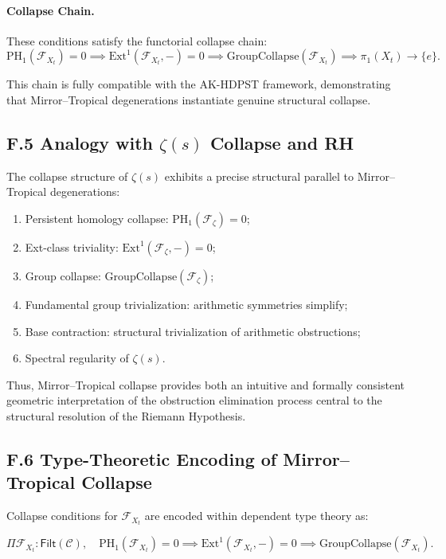 \documentclass[11pt]{article}
\begin{document}
\paragraph{Collapse Chain.}  
These conditions satisfy the functorial collapse chain:
\[
\mathrm{PH}_1(\mathcal{F}_{X_t}) = 0 
\implies \mathrm{Ext}^1(\mathcal{F}_{X_t}, -) = 0 
\implies \mathrm{GroupCollapse}(\mathcal{F}_{X_t}) 
\implies \pi_1(X_t) \longrightarrow \{ e \}.
\]

This chain is fully compatible with the AK-HDPST framework, demonstrating that Mirror–Tropical degenerations instantiate genuine structural collapse.

\subsection*{F.5 Analogy with $\zeta(s)$ Collapse and RH}

The collapse structure of $\zeta(s)$ exhibits a precise structural parallel to Mirror–Tropical degenerations:

\begin{enumerate}
    \item Persistent homology collapse: $\mathrm{PH}_1(\mathcal{F}_{\zeta}) = 0$;
    \item Ext-class triviality: $\mathrm{Ext}^1(\mathcal{F}_{\zeta}, -) = 0$;
    \item Group collapse: $\mathrm{GroupCollapse}(\mathcal{F}_{\zeta})$;
    \item Fundamental group trivialization: arithmetic symmetries simplify;
    \item Base contraction: structural trivialization of arithmetic obstructions;
    \item Spectral regularity of $\zeta(s)$.
\end{enumerate}

Thus, Mirror–Tropical collapse provides both an intuitive and formally consistent geometric interpretation of the obstruction elimination process central to the structural resolution of the Riemann Hypothesis.

\subsection*{F.6 Type-Theoretic Encoding of Mirror–Tropical Collapse}

Collapse conditions for $\mathcal{F}_{X_t}$ are encoded within dependent type theory as:

\[
\Pi \mathcal{F}_{X_t} : \mathsf{Filt}(\mathcal{C}), \quad 
\mathrm{PH}_1(\mathcal{F}_{X_t}) = 0 \implies 
\mathrm{Ext}^1(\mathcal{F}_{X_t}, -) = 0 \implies 
\mathrm{GroupCollapse}(\mathcal{F}_{X_t}).
\]
\end{document}
